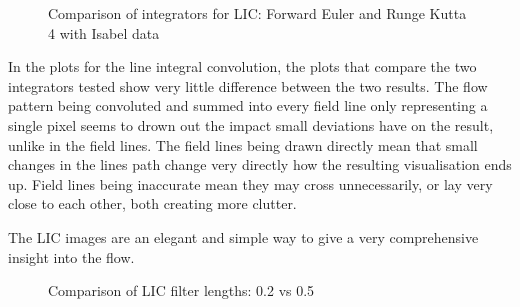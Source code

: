 \documentclass{article}
\begin{document}
\begin{figure}
\caption{Comparison of integrators for LIC: Forward Euler and Runge Kutta 4 with Isabel data}
\end{figure}

In the plots for the line integral convolution, the plots that compare the two integrators
tested show very little difference between the two results. The flow pattern being
convoluted and summed into every field line only representing a single pixel seems
to drown out the impact small deviations have on the result, unlike in the field lines.
The field lines being drawn directly mean that small changes in the lines path change
very directly how the resulting visualisation ends up. Field lines being inaccurate mean
they may cross unnecessarily, or lay very close to each other, both creating more clutter.

The LIC images are an elegant and simple way to give a very comprehensive insight into
the flow.

\begin{figure}
\caption{Comparison of LIC filter lengths: 0.2 vs 0.5}
\end{figure}
\end{document}
